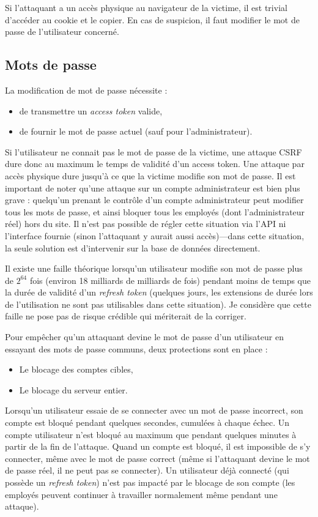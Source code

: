 Si l'attaquant a un accès physique au navigateur de la victime, il est trivial d'accéder au cookie et le copier.
En cas de suspicion, il faut modifier le mot de passe de l'utilisateur concerné.

\subsection{Mots de passe}\label{subsec:mots-de-passe}

La modification de mot de passe nécessite :
\begin{itemize}
	\item de transmettre un \emph{access token} valide,
	\item de fournir le mot de passe actuel (sauf pour l'administrateur).
\end{itemize}

Si l'utilisateur ne connait pas le mot de passe de la victime, une attaque CSRF dure donc au maximum le temps de validité d'un access token.
Une attaque par accès physique dure jusqu'à ce que la victime modifie son mot de passe.
Il est important de noter qu'une attaque sur un compte administrateur est bien plus grave :
quelqu'un prenant le contrôle d'un compte administrateur peut modifier tous les mots de passe, et ainsi bloquer tous les employés (dont l'administrateur réel) hors du site.
Il n'est pas possible de régler cette situation via l'API ni l'interface fournie (sinon l'attaquant y aurait aussi accès)---dans cette situation, la seule solution est d'intervenir sur la base de données directement.

Il existe une faille théorique lorsqu'un utilisateur modifie son mot de passe plus de $2^{64}$ fois (environ 18 milliards de milliards de fois) pendant moins de temps que la durée de validité d'un \emph{refresh token} (quelques jours, les extensions de durée lors de l'utilisation ne sont pas utilisables dans cette situation).
Je considère que cette faille ne pose pas de risque crédible qui mériterait de la corriger.

\uparagraph
Pour empêcher qu'un attaquant devine le mot de passe d'un utilisateur en essayant des mots de passe communs, deux protections sont en place :
\begin{itemize}
	\item Le blocage des comptes cibles,
	\item Le blocage du serveur entier.
\end{itemize}

Lorsqu'un utilisateur essaie de se connecter avec un mot de passe incorrect, son compte est bloqué pendant quelques secondes, cumulées à chaque échec.
Un compte utilisateur n'est bloqué au maximum que pendant quelques minutes à partir de la fin de l'attaque.
Quand un compte est bloqué, il est impossible de s'y connecter, même avec le mot de passe correct (même si l'attaquant devine le mot de passe réel, il ne peut pas se connecter).
Un utilisateur déjà connecté (qui possède un \emph{refresh token}) n'est pas impacté par le blocage de son compte (les employés peuvent continuer à travailler normalement même pendant une attaque).

